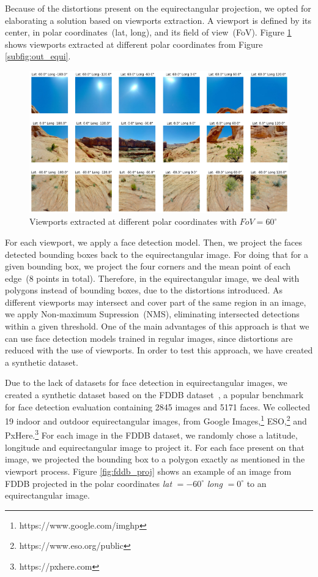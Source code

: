 Because of the distortions present on the equirectangular projection, we opted for elaborating a solution based on viewports extraction. A viewport is defined by its center, in polar coordinates~(lat, long), and its field of view~(FoV). Figure \ref{fig:viewports} shows viewports extracted at different polar coordinates from Figure \ref{subfig:out_equi}.

\begin{figure}[!ht]
    \centering
    \includegraphics[width=1\textwidth]{img/viewports.png}
    \caption{Viewports extracted at different polar coordinates with $FoV = 60^{\circ}$}
    \label{fig:viewports}
\end{figure}

For each viewport, we apply a face detection model. 
Then, we project the faces detected bounding boxes back to the equirectangular image. For doing that for a given bounding box, we project the four corners and the mean point of each edge~(8 points in total). Therefore, in the equirectangular image, we deal with polygons instead of bounding boxes, due to the distortions introduced. As different viewports may intersect and cover part of the same region in an image, we apply Non-maximum Supression~(NMS), eliminating intersected detections within a given threshold. One of the main advantages of this approach is that we can use face detection models trained in regular images, since distortions are reduced with the use of viewports. In order to test this approach, we have created a synthetic dataset.

Due to the lack of datasets for face detection in equirectangular images, we created a synthetic dataset based on the FDDB dataset~\cite{fddbTech}, a popular benchmark for face detection evaluation containing 2845 images and 5171 faces. We collected 19 indoor and outdoor equirectangular images, from Google Images,\footnote{https://www.google.com/imghp} ESO,\footnote{https://www.eso.org/public} and PxHere.\footnote{https://pxhere.com}
For each image in the FDDB dataset, we randomly chose a latitude, longitude and equirectangular image to project it. For each face present on that image, we projected the bounding box to a polygon exactly as mentioned in the viewport process. Figure \ref{fig:fddb_proj} shows an example of an image from FDDB projected in the polar coordinates \emph{lat} $ = -60^{\circ}$ \emph{long} $= 0^{\circ}$ to an equirectangular image.

